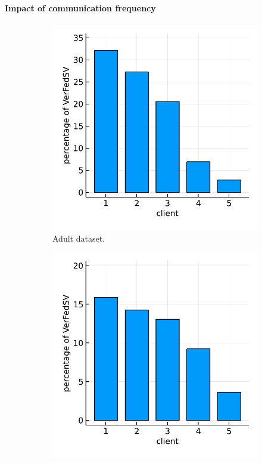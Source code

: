 \paragraph{Impact of communication frequency}

\begin{figure}[t]
\begin{subfigure}{.24\textwidth}
  \centering
  \includegraphics[width=\linewidth]{./figures/asyn_same_features_adult.pdf}
  \caption{Adult dataset.}
  \label{fig:asyn_same_feature_adult}
\end{subfigure}%
\begin{subfigure}{.24\textwidth}
  \centering
  \includegraphics[width=\linewidth]{./figures/asyn_same_features_web.pdf}

\end{subfigure}
\end{figure}
